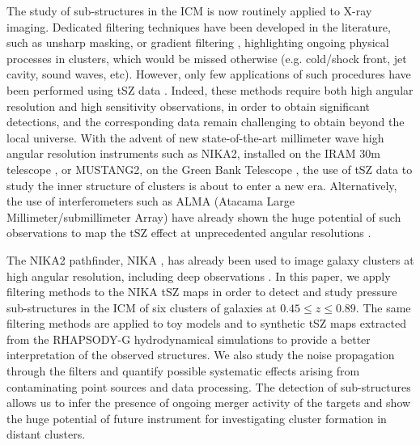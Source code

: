 \documentclass[twocolumn,traditabstract]{aa}
\begin{document}
The study of sub-structures in the ICM is now routinely applied to X-ray imaging. Dedicated filtering techniques have been developed in the literature, such as unsharp masking, or gradient filtering \citep[see, for example, recent results by][]{Sanders2016a}, highlighting ongoing physical processes in clusters, which would be missed otherwise (e.g. cold/shock front, jet cavity, sound waves, etc). However, only few applications of such procedures have been performed using tSZ data \citep[see e.g.][using simulated nearby Planck clusters]{Bourdin2015}. Indeed, these methods require both high angular resolution and high sensitivity observations, in order to obtain significant detections, and the corresponding data remain challenging to obtain beyond the local universe. With the advent of new state-of-the-art millimeter wave high angular resolution instruments such as NIKA2, installed on the IRAM 30m telescope \citep[The New IRAM KIDs Array 2, $< 20$ arcsec resolution at 150 and 260 GHz,][]{Calvo2016,Catalano2016,NIKA2017}, or MUSTANG2, on the Green Bank Telescope \citep[The MUltiplexed Squid Tes Array at Ninety Gigahertzh 2, $\sim 8$ arcsec at 90 GHz,][]{Dicker2014}, the use of tSZ data to study the inner structure of clusters is about to enter a new era. Alternatively, the use of interferometers such as ALMA (Atacama Large Millimeter/submillimeter Array) have already shown the huge potential of such observations to map the tSZ effect at unprecedented angular resolutions \citep{Kitayama2016,Basu2016}.

The NIKA2 pathfinder, NIKA \citep{Monfardini2011,Catalano2014}, has already been used to image galaxy clusters at high angular resolution, including deep observations \citep{Adam2014,Adam2015,Adam2016a,Adam2016b,Ruppin2016}. In this paper, we apply filtering methods to the NIKA tSZ maps in order to detect and study pressure sub-structures in the ICM of six clusters of galaxies at $0.45 \leq z \leq 0.89$. The same filtering methods are applied to toy models and to synthetic tSZ maps extracted from the RHAPSODY-G hydrodynamical simulations \citep{Wu2013,Hahn2017} to provide a better interpretation of the observed structures. We also study the noise propagation through the filters and quantify possible systematic effects arising from contaminating point sources and data processing. The detection of sub-structures allows us to infer the presence of ongoing merger activity of the targets and show the huge potential of future instrument for investigating cluster formation in distant clusters.
\end{document}
